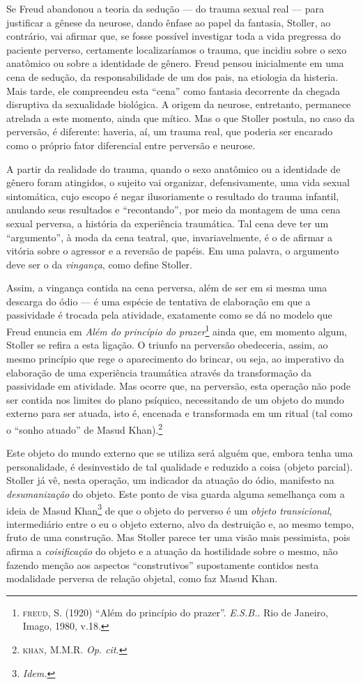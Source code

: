 Se Freud abandonou a teoria da sedução --- do trauma sexual real ---
para justificar a gênese da neurose, dando ênfase ao papel da fantasia,
Stoller, ao contrário, vai afirmar que, se fosse possível investigar
toda a vida pregressa do paciente perverso, certamente localizaríamos o
trauma, que incidiu sobre o sexo anatômico ou sobre a identidade de
gênero. Freud pensou inicialmente em uma cena de sedução, da
responsabilidade de um dos pais, na etiologia da histeria. Mais tarde,
ele compreendeu esta ``cena'' como fantasia decorrente da chegada
disruptiva da sexualidade biológica. A origem da neurose, entretanto,
permanece atrelada a este momento, ainda que mítico. Mas o que Stoller
postula, no caso da perversão, é diferente: haveria, aí, um trauma real,
que poderia ser encarado como o próprio fator diferencial entre
perversão e neurose.

A partir da realidade do trauma, quando o sexo anatômico ou a identidade
de gênero foram atingidos, o sujeito vai organizar, defensivamente, uma
vida sexual sintomática, cujo escopo é negar ilusoriamente o resultado
do trauma infantil, anulando seus resultados e ``recontando'', por meio
da montagem de uma cena sexual perversa, a história da experiência
traumática. Tal cena deve ter um ``argumento'', à moda da cena teatral,
que, invariavelmente, é o de afirmar a vitória sobre o agressor e a
reversão de papéis. Em uma palavra, o argumento deve ser o da
\emph{vingança}, como define Stoller.

Assim, a vingança contida na cena perversa, além de ser em si mesma uma
descarga do ódio --- é uma espécie de tentativa de elaboração em que a
passividade é trocada pela atividade, exatamente como se dá no modelo
que Freud enuncia em \emph{Além do princípio do prazer}\footnote{\textsc{freud},
  S. (1920) ``Além do princípio do prazer''. \emph{E.S.B.}. Rio de
  Janeiro, Imago, 1980, v.18.} ainda que, em momento algum, Stoller se
refira a esta ligação. O triunfo na perversão obedeceria, assim, ao
mesmo princípio que rege o aparecimento do brincar, ou seja, ao
imperativo da elaboração de uma experiência traumática através da
transformação da passividade em atividade. Mas ocorre que, na perversão,
esta operação não pode ser contida nos limites do plano psíquico,
necessitando de um objeto do mundo externo para ser atuada, isto é,
encenada e transformada em um ritual (tal como o ``sonho atuado'' de
Masud Khan).\footnote{\textsc{khan}, M.M.R. \emph{Op. cit.}}

Este objeto do mundo externo que se utiliza será alguém que, embora
tenha uma personalidade, é desinvestido de tal qualidade e reduzido a
coisa (objeto parcial). Stoller já vê, nesta operação, um indicador da
atuação do ódio, manifesto na \emph{desumanização} do objeto. Este ponto
de visa guarda alguma semelhança com a ideia de Masud Khan\footnote{\emph{Idem.}}
de que o objeto do perverso é um \emph{objeto transicional},
intermediário entre o eu o objeto externo, alvo da destruição e, ao
mesmo tempo, fruto de uma construção. Mas Stoller parece ter uma visão
mais pessimista, pois afirma a \emph{coisificação} do objeto e a atuação
da hostilidade sobre o mesmo, não fazendo menção aos aspectos
``construtivos'' supostamente contidos nesta modalidade perversa de
relação objetal, como faz Masud Khan.

